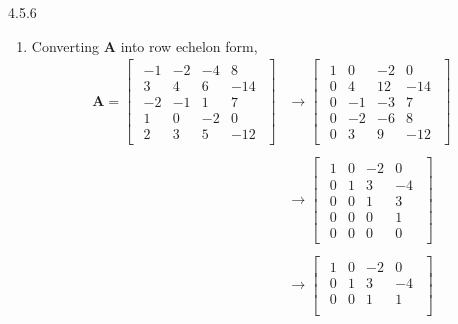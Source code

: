 \documentclass{article}
\theoremstyle{definition}
\begin{document}
\begin{prob}{4.5.6}
\begin{enumerate}[label=\alph*.)]
        	\item Converting $ \mathbf{A} $ into row echelon form,
        		\begin{align*}
        			\mathbf{A} = 
        				\begin{bmatrix}
        					\begin{array}{rrrr}
        						-1 & -2 & -4 & 8 \\ 
        						 3 & 4  & 6  & -14 \\
        						-2 & -1 & 1  & 7 \\
        						1  & 0  & -2 & 0 \\
        						2  & 3  & 5  & -12
        					\end{array}
        				\end{bmatrix}
        			&\longrightarrow 
        				\begin{bmatrix}
        					\begin{array}{rrrr}
        						1 & 0  & -2  & 0 \\ 
        						0 & 4  & 12  & -14 \\
        						0 & -1 & -3  & 7 \\
        						0 & -2 & -6  & 8 \\
        						0 & 3  & 9   & -12
        					\end{array}
        				\end{bmatrix} \\ \\
        			&\longrightarrow
        				\begin{bmatrix}
        					\begin{array}{rrrr}
        						1 & 0  & -2 & 0 \\ 
        						0 & 1  & 3  & -4 \\
        						0 & 0  & 1  & 3 \\
        						0 & 0  & 0  & 1 \\
        						0 & 0  & 0  & 0
        					\end{array}
        				\end{bmatrix} \\ \\
        			&\longrightarrow
        				\begin{bmatrix}
        					\begin{array}{rrrr}
        						1 & 0  & -2 & 0 \\ 
        						0 & 1  & 3  & -4 \\
        						0 & 0  & 1  & 1 \\

\end{array}
\end{bmatrix}
\end{align*}
\end{enumerate}
\end{prob}
\end{document}
